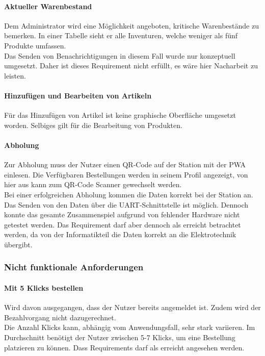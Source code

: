 \paragraph{Aktueller Warenbestand}
Dem Administrator wird eine Möglichkeit angeboten, kritische Warenbestände zu bemerken. In einer Tabelle sieht er alle Inventuren, welche weniger als fünf Produkte umfassen. \\
Das Senden von Benachrichtigungen in diesem Fall wurde nur konzeptuell umgesetzt. Daher ist dieses Requirement nicht erfüllt, es wäre hier Nacharbeit zu leisten. 

\paragraph{Hinzufügen und Bearbeiten von Artikeln}
Für das Hinzufügen von Artikel ist keine graphische Oberfläche umgesetzt worden. Selbiges gilt für die Bearbeitung von Produkten.

\paragraph{Abholung}
Zur Abholung muss der Nutzer einen QR-Code auf der Station mit der \gls{PWA} einlesen. Die Verfügbaren Bestellungen werden in seinem Profil angezeigt, von hier aus kann zum QR-Code Scanner gewechselt werden. \\
Bei einer erfolgreichen Abholung kommen die Daten korrekt bei der Station an. Das Senden von den Daten über die \ac{UART}-Schnittstelle ist möglich. Dennoch konnte das gesamte Zusammenspiel aufgrund von fehlender Hardware nicht getestet werden. Das Requirement darf aber dennoch als erreicht betrachtet werden, da von der Informatikteil die Daten korrekt an die Elektrotechnik übergibt. 

\subsubsection{Nicht funktionale Anforderungen}
\paragraph{Mit 5 Klicks bestellen}
Wird davon ausgegangen, dass der Nutzer bereits angemeldet ist. Zudem wird der Bezahlvorgang nicht dazugerechnet. \\
Die Anzahl Klicks kann, abhängig vom Anwendungsfall, sehr stark variieren. Im Durchschnitt benötigt der Nutzer zwischen 5-7 Klicks, um eine Bestellung platzieren zu können. Dass Requirements darf als erreicht angesehen werden. 

